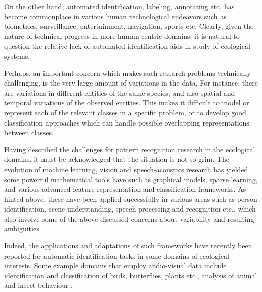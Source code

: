 \documentclass{article}
\begin{document}
On the other hand, automated identification, labeling, annotating etc. has become commonplace in various human technological endeavors such as biometrics, surveillance, entertainment, navigation, sports etc. Clearly, given the nature of technical progress in more human-centric domains, it is natural to question the relative lack of automated identification aids in study of ecological systems. 

Perhaps, an important concern %
which makes such research problems technically challenging, is the very large amount of variations in the data. For instance, there are variations in different entities of the same species, and also spatial and temporal variations of the observed entities. This makes it difficult to model or represent each of the relevant classes in a specific problem, or to develop good classification approaches which can handle possible overlapping representations between classes.

Having described the challenges for pattern recognition research in the ecological domains, it must be acknowledged that the situation is not so grim. The evolution of machine learning, vision and speech-acoustics research has yielded some powerful mathematical tools have such as graphical models, sparse learning, and various advanced feature representation and classification frameworks. 
As hinted above, these have been applied successfully in various areas such as person identification, scene understanding, speech processing and recognition etc., which also involve some of the above discussed concerns about variability and resulting ambiguities. 

Indeed, the applications and adaptations of such frameworks have recently been reported for automatic identification tasks in some domains of ecological interests. Some example domains that employ audio-visual data include identification and classification of birds, butterflies, plants etc., analysis of animal and insect behaviour \cite{leaf,butterfly,hierarchy,poof,brandes_automatedSoundRecording2008}. 
\end{document}
